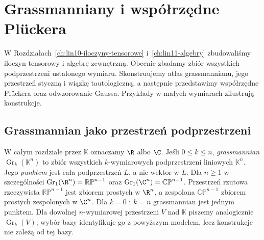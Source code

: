 \chapter{Grassmanniany i współrzędne Plückera}
\label{ch:lin29-grassmanniany}

\providecommand{\atlasref}[2]{#2}

W Rozdziałach~\ref{ch:lin10-iloczyny-tensorowe}
i~\ref{ch:lin11-algebry} zbudowaliśmy iloczyn tensorowy
i algebrę zewnętrzną. Obecnie zbadamy zbiór wszystkich
podprzestrzeni ustalonego wymiaru.
Skonstruujemy atlas grassmannianu, jego przestrzeń styczną
i wiązkę tautologiczną, a następnie przedstawimy
współrzędne Plückera oraz odwzorowanie Gaussa.
Przykłady w małych wymiarach zilustrują konstrukcje.

\section{Grassmannian jako przestrzeń podprzestrzeni}
\label{sec:lin29-grass-atlas}

W całym rozdziale przez $\mathbb K$ oznaczamy
$\R$ albo $\C$.
Jeśli $0\leq k\leq n$, \emph{grassmannian}
$\operatorname{Gr}_k(\mathbb K^n)$ to zbiór wszystkich
$k$-wymiarowych podprzestrzeni liniowych $\mathbb K^n$.
Jego \emph{punktem} jest cała podprzestrzeń $L$,
a nie wektor w $L$. Dla $n\ge1$ w szczególności
$\operatorname{Gr}_1(\R^n)=\mathbb{RP}^{n-1}$
oraz
$\operatorname{Gr}_1(\C^n)=\mathbb{CP}^{n-1}$.
Przestrzeń rzutowa rzeczywista
$\mathbb{RP}^{n-1}$ jest zbiorem prostych w $\R^n$,
a zespolona $\mathbb{CP}^{n-1}$ zbiorem
prostych zespolonych w $\C^n$.
Dla $k=0$ i $k=n$ grassmannian jest jednym punktem.
Dla dowolnej $n$-wymiarowej przestrzeni $V$ nad $\mathbb K$
piszemy analogicznie $\operatorname{Gr}_k(V)$; wybór bazy
identyfikuje go z powyższym modelem, lecz konstrukcje nie zależą od tej bazy.

